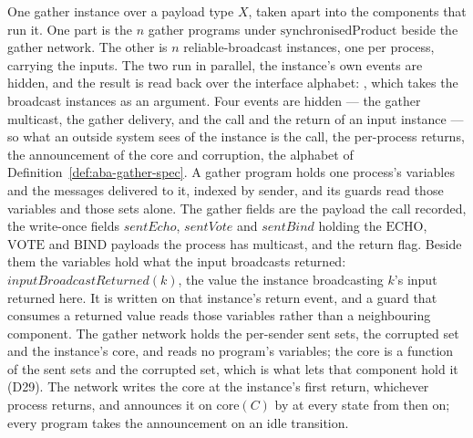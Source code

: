 \begin{definition}
  \label{def:aba-gather-composition}
  \leanok
  One gather instance over a payload type $X$, taken apart into the components that run it.
  One part is the $n$ gather programs under $\mathrm{synchronisedProduct}$ beside the gather network.
  The other is $n$ reliable-broadcast instances, one per process, carrying the inputs.
  The two run in parallel, the instance's own events are hidden, and the result is read back over the interface alphabet: , which takes the broadcast instances as an argument.
  Four events are hidden --- the gather multicast, the gather delivery, and the call and the return of an input instance --- so what an outside system sees of the instance is the call, the per-process returns, the announcement of the core and corruption, the alphabet of Definition~\ref{def:aba-gather-spec}.
  A gather program holds one process's variables and the messages delivered to it, indexed by sender, and its guards read those variables and those sets alone.
  The gather fields are the payload the call recorded, the write-once fields $\mathit{sentEcho}$, $\mathit{sentVote}$ and $\mathit{sentBind}$ holding the $\mathrm{ECHO}$, $\mathrm{VOTE}$ and $\mathrm{BIND}$ payloads the process has multicast, and the return flag.
  Beside them the variables hold what the input broadcasts returned: $\mathit{inputBroadcastReturned}(k)$, the value the instance broadcasting $k$'s input returned here.
  It is written on that instance's return event, and a guard that consumes a returned value reads those variables rather than a neighbouring component.
  The gather network holds the per-sender sent sets, the corrupted set and the instance's core, and reads no program's variables; the core is a function of the sent sets and the corrupted set, which is what lets that component hold it (D29).
  The network writes the core at the instance's first return, whichever process returns, and announces it on $\mathrm{core}(C)$ by  at every state from then on; every program takes the announcement on an idle transition.

\end{definition}
